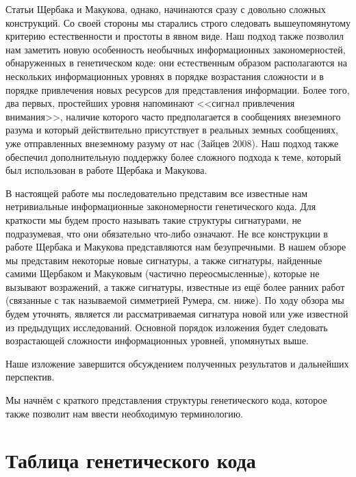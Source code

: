 \documentclass[12pt]{article}
\begin{document}
Статьи Щербака и Макукова, однако, начинаются сразу с довольно сложных конструкций. Со своей стороны мы старались строго следовать вышеупомянутому критерию естественности и простоты в явном виде. Наш подход также позволил нам заметить новую особенность необычных информационных закономерностей, обнаруженных в генетическом коде: они естественным образом располагаются на нескольких информационных уровнях в порядке возрастания сложности и в порядке привлечения новых ресурсов для представления информации. Более того, два первых, простейших уровня напоминают <<сигнал привлечения внимания>>, наличие которого часто предполагается в сообщениях внеземного разума и который действительно присутствует в реальных земных сообщениях, уже отправленных внеземному разуму от нас (Зайцев 2008). Наш подход также обеспечил дополнительную поддержку более сложного подхода к теме, который был использован в работе Щербака и Макукова.

В настоящей работе мы последовательно представим все известные нам нетривиальные информационные закономерности генетического кода. Для краткости мы будем просто называть такие структуры сигнатурами, не подразумевая, что они обязательно что-либо означают. Не все конструкции в работе Щербака и Макукова представляются нам безупречными. В нашем обзоре мы представим некоторые новые сигнатуры, а также сигнатуры, найденные самими Щербаком и Макуковым (частично переосмысленные), которые не вызывают возражений, а также сигнатуры, известные из ещё более ранних работ (связанные с так называемой симметрией Румера, см. ниже). По ходу обзора мы будем уточнять, является ли рассматриваемая сигнатура новой или уже известной из предыдущих исследований. Основной порядок изложения будет следовать возрастающей сложности информационных уровней, упомянутых выше.

Наше изложение завершится обсуждением полученных результатов и дальнейших перспектив.

Мы начнём с краткого представления структуры генетического кода, которое также позволит нам ввести необходимую терминологию.

\section{Таблица генетического кода}
\end{document}
